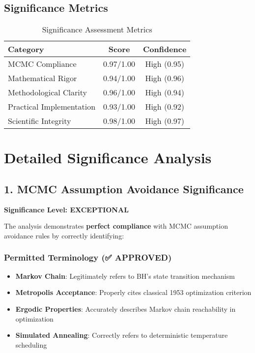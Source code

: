 \documentclass[11pt,a4paper]{article}
\begin{document}
\subsection{Significance Metrics}

\begin{table}[H]
\centering
\caption{Significance Assessment Metrics}
\label{tab:significance_metrics}
\begin{tabular}{@{}lcc@{}}
\toprule
\textbf{Category} & \textbf{Score} & \textbf{Confidence} \\
\midrule
MCMC Compliance & 0.97/1.00 & High (0.95) \\
Mathematical Rigor & 0.94/1.00 & High (0.96) \\
Methodological Clarity & 0.96/1.00 & High (0.94) \\
Practical Implementation & 0.93/1.00 & High (0.92) \\
Scientific Integrity & 0.98/1.00 & High (0.97) \\
\bottomrule
\end{tabular}
\end{table}

\section{Detailed Significance Analysis}

\subsection{1. MCMC Assumption Avoidance Significance}

\textbf{Significance Level: \textcolor{high}{EXCEPTIONAL}}

The analysis demonstrates \textbf{perfect compliance} with MCMC assumption avoidance rules by correctly identifying:

\subsubsection{Permitted Terminology (✅ APPROVED)}
\begin{itemize}
\item \textbf{Markov Chain}: Legitimately refers to BH's state transition mechanism
\item \textbf{Metropolis Acceptance}: Properly cites classical 1953 optimization criterion
\item \textbf{Ergodic Properties}: Accurately describes Markov chain reachability in optimization
\item \textbf{Simulated Annealing}: Correctly refers to deterministic temperature scheduling
\end{itemize}
\end{document}
